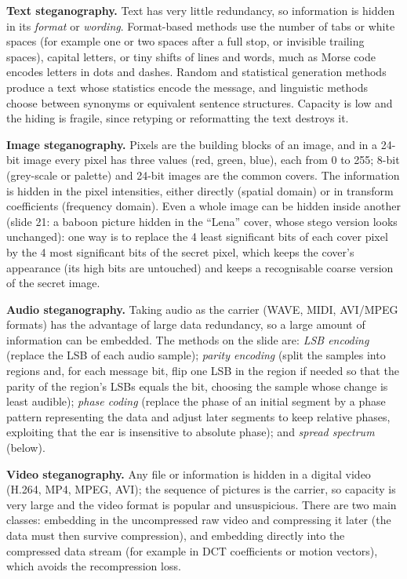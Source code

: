 \textbf{Text steganography.} Text has very little redundancy, so information is hidden in its \emph{format} or \emph{wording}. Format-based methods use the number of tabs or white spaces (for example one or two spaces after a full stop, or invisible trailing spaces), capital letters, or tiny shifts of lines and words, much as Morse code encodes letters in dots and dashes. Random and statistical generation methods produce a text whose statistics encode the message, and linguistic methods choose between synonyms or equivalent sentence structures. Capacity is low and the hiding is fragile, since retyping or reformatting the text destroys it.

\textbf{Image steganography.} Pixels are the building blocks of an image, and in a 24-bit image every pixel has three values (red, green, blue), each from 0 to 255; 8-bit (grey-scale or palette) and 24-bit images are the common covers. The information is hidden in the pixel intensities, either directly (spatial domain) or in transform coefficients (frequency domain). Even a whole image can be hidden inside another (slide 21: a baboon picture hidden in the ``Lena'' cover, whose stego version looks unchanged): one way is to replace the 4 least significant bits of each cover pixel by the 4 most significant bits of the secret pixel, which keeps the cover's appearance (its high bits are untouched) and keeps a recognisable coarse version of the secret image.

\textbf{Audio steganography.} Taking audio as the carrier (WAVE, MIDI, AVI/MPEG formats) has the advantage of large data redundancy, so a large amount of information can be embedded. The methods on the slide are: \emph{LSB encoding} (replace the LSB of each audio sample); \emph{parity encoding} (split the samples into regions and, for each message bit, flip one LSB in the region if needed so that the parity of the region's LSBs equals the bit, choosing the sample whose change is least audible); \emph{phase coding} (replace the phase of an initial segment by a phase pattern representing the data and adjust later segments to keep relative phases, exploiting that the ear is insensitive to absolute phase); and \emph{spread spectrum} (below).

\textbf{Video steganography.} Any file or information is hidden in a digital video (H.264, MP4, MPEG, AVI); the sequence of pictures is the carrier, so capacity is very large and the video format is popular and unsuspicious. There are two main classes: embedding in the uncompressed raw video and compressing it later (the data must then survive compression), and embedding directly into the compressed data stream (for example in DCT coefficients or motion vectors), which avoids the recompression loss.

